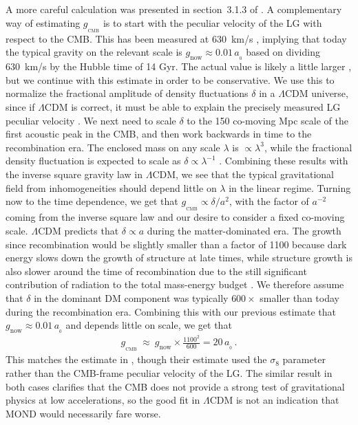 \documentclass[fleqn,usenatbib,useAMS,onecolumn]{mnras} %
\begin{document}
A more careful calculation was presented in section~3.1.3 of \citet{Haslbauer_2020}. A complementary way of estimating $g_{_{\text{CMB}}}$ is to start with the peculiar velocity of the LG with respect to the CMB. This has been measured at 630~km/s \citep{Kogut_1993}, implying that today the typical gravity on the relevant scale is $g_{\text{now}} \approx 0.01 \, a_{_0}$ based on dividing 630~km/s by the Hubble time of 14 Gyr. The actual value is likely a little larger \citep[see section~2.2 of][]{Banik_Ryan_2018}, but we continue with this estimate in order to be conservative. We use this to normalize the fractional amplitude of density fluctuations $\delta$ in a $\Lambda$CDM universe, since if $\Lambda$CDM is correct, it must be able to explain the precisely measured LG peculiar velocity \citep[this assumption was verified in e.g.][]{Candlish_2016}. We next need to scale $\delta$ to the 150 co-moving Mpc scale of the first acoustic peak in the CMB, and then work backwards in time to the recombination era. The enclosed mass on any scale $\lambda$ is $\propto \lambda^3$, while the fractional density fluctuation is expected to scale as $\delta \propto \lambda^{-1}$ \citep{Harrison_1970, Zeldovich_1972}. Combining these results with the inverse square gravity law in $\Lambda$CDM, we see that the typical gravitational field from inhomogeneities should depend little on $\lambda$ in the linear regime. Turning now to the time dependence, we get that $g_{_{\text{CMB}}} \propto \delta/a^2$, with the factor of $a^{-2}$ coming from the inverse square law and our desire to consider a fixed co-moving scale. $\Lambda$CDM predicts that $\delta \propto a$ during the matter-dominated era. The growth since recombination would be slightly smaller than a factor of 1100 because dark energy slows down the growth of structure at late times, while structure growth is also slower around the time of recombination due to the still significant contribution of radiation to the total mass-energy budget \citep[the Meszaros effect;][]{Meszaros_1974}. We therefore assume that $\delta$ in the dominant DM component was typically $600\times$ smaller than today during the recombination era. Combining this with our previous estimate that $g_{\text{now}} \approx 0.01 \, a_{_0}$ and depends little on scale, we get that
\begin{eqnarray}
    g_{_{\text{CMB}}} ~\approx~ g_{\text{now}} \times \frac{1100^2}{600} = 20 \, a_{_0} \, .
\end{eqnarray}
This matches the estimate in \citet{Haslbauer_2020}, though their estimate used the $\sigma_8$ parameter rather than the CMB-frame peculiar velocity of the LG. The similar result in both cases clarifies that the CMB does not provide a strong test of gravitational physics at low accelerations, so the good fit in $\Lambda$CDM is not an indication that MOND would necessarily fare worse.
\end{document}
